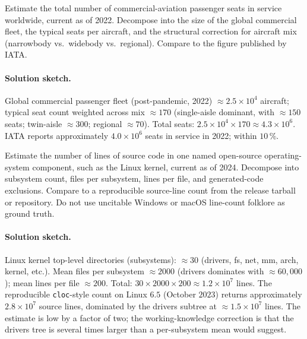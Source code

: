 \begin{exercise}
Estimate the total number of commercial-aviation passenger seats in
service worldwide, current as of 2022. Decompose into the size of
the global commercial fleet, the typical seats per aircraft, and
the structural correction for aircraft mix (narrowbody vs.~widebody
vs.~regional). Compare to the figure published by IATA.
\end{exercise}

\paragraph{Solution sketch.}
Global commercial passenger fleet (post-pandemic, 2022) $\approx
2.5 \times 10^{4}$ aircraft; typical seat count weighted across mix
$\approx 170$ (single-aisle dominant, with $\approx 150$ seats;
twin-aisle $\approx 300$; regional $\approx 70$). Total seats:
$2.5 \times 10^{4} \times 170 \approx 4.3 \times 10^{6}$. IATA
reports approximately $4.0 \times 10^{6}$ seats in service in
2022; within $10\,\%$.

\begin{exercise}
Estimate the number of lines of source code in one named open-source
operating-system component, such as the Linux kernel, current as of
2024. Decompose into subsystem count, files per subsystem, lines
per file, and generated-code exclusions. Compare to a reproducible
source-line count from the release tarball or repository. Do not
use uncitable Windows or macOS line-count folklore as ground truth.
\end{exercise}

\paragraph{Solution sketch.}
Linux kernel top-level directories (subsystems): $\approx 30$
(drivers, fs, net, mm, arch, kernel, etc.). Mean files per
subsystem $\approx 2000$ (drivers dominates with $\approx 60{,}000$);
mean lines per file $\approx 200$. Total: $30 \times 2000 \times
200 \approx 1.2 \times 10^{7}$ lines. The reproducible
\texttt{cloc}-style count on Linux $6.5$ (October $2023$) returns
approximately $2.8 \times 10^{7}$ source lines, dominated by the
drivers subtree at $\approx 1.5 \times 10^{7}$ lines. The estimate
is low by a factor of two; the working-knowledge correction is
that the drivers tree is several times larger than a per-subsystem
mean would suggest.

